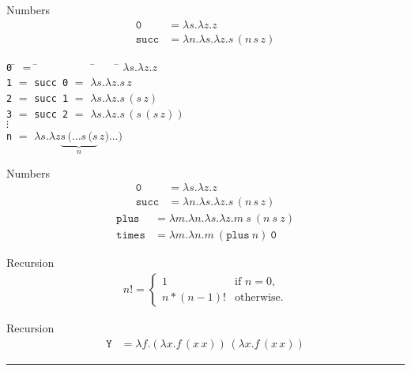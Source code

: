 \documentclass{beamer}
\newcommand{\mkw}[1]{{\bf \mathtt{#1}}}
\newcommand{\sym}[1]{\texttt{#1}}
\newcommand{\msym}[1]{\mathtt{#1}}
\newcommand{\hr}[0]{\rule{10.75cm}{0.4pt}\\}
\newcommand{\centeredtab}[1]{\begin{center}\parbox{0cm}{\begin{tabbing}#1\end{tabbing}}\end{center}}
\begin{document}
\begin{frame}{Numbers}
\begin{align*}
\msym{0}    &= \lambda s.\lambda z.z \\
\msym{succ} &= \lambda n.\lambda s.\lambda z.s\,(n\,s\,z)
\end{align*}
\centeredtab{
\sym{0} \= $=$ \= ~~~~~~~~~    \= ~~~ \= $\lambda s.\lambda z.z$    \\
\sym{1} \> $=$ \> \sym{succ 0} \> $=$ \> $\lambda s.\lambda z.s\,z$ \\
\sym{2} \> $=$ \> \sym{succ 1} \> $=$ \> $\lambda s.\lambda z.s\,(s\,z)$ \\
\sym{3} \> $=$ \> \sym{succ 2} \> $=$ \> $\lambda s.\lambda z.s\,(s\,(s\,z))$ \\
$\vdots$ \\
\sym{n} \> $=$ \> \> \> $\lambda s.\lambda z\underbrace{s\,(\dots s\,(s}_n\,z)\dots)$
}
\end{frame}
\begin{frame}{Numbers}
\begin{align*}
\msym{0}    &= \lambda s.\lambda z.z \\
\msym{succ} &= \lambda n.\lambda s.\lambda z.s\,(n\,s\,z)
\end{align*}
\begin{align*}
\msym{plus}  &= \lambda m.\lambda n.\lambda s. \lambda z.m\ s\ (n\ s\ z) \\
\msym{times} &= \lambda m.\lambda n.m\ (\msym{plus}\ n)\ \msym{0}
\end{align*}
\end{frame}
\begin{frame}{Recursion}
\begin{align*}
n!=\begin{cases}
    1 & \text{if $n=0$},\\
    n*(n-1)! & \text{otherwise}.
  \end{cases}
\end{align*}
\end{frame}
\begin{frame}{Recursion}
\begin{align*}
\msym{Y} &= \lambda f.(\lambda x.f\,(x\,x))\,(\lambda x.f\,(x\,x))
\end{align*}
\hr
\begin{align*}
\phantom{\msym{g} = \lambda f.\lambda
n.\mkw{if}\ \msym{eq}\ n\ \msym{0}\ \mkw{then}\ \msym{1}\ \mkw{else}\ (\msym{times}\ \msym{n}\,(f\,(\msym{pred}\ \msym{n})))} \\
\phantom{\msym{factorial} = \msym{Y}\ \msym{g}}
\end{align*}
\end{frame}
\end{document}
